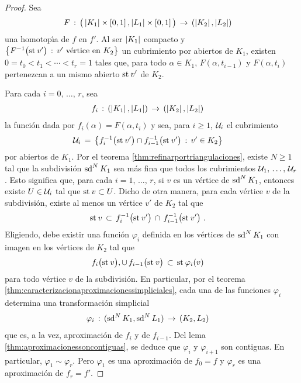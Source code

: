\begin{proof}
	Sea
	\begin{align*}
		F & \,:\,\big(\geom{K_{1}}\times\intervalo,
				\geom{L_{1}}\times\intervalo\big)
			\,\rightarrow\, (\geom{K_{2}},\geom{L_{2}})
	\end{align*}
	una homotop\'{\i}a de $f$ en $f'$. Al ser $\geom{K_{1}}$ compacto y
	\begin{math}
		\big\{F^{-1}\big(\estrella{v'}\big)\,:\,
			v'\text{ v\'{e}rtice en }K_{2}\big\}
	\end{math}
	un cubrimiento por abiertos de $K_{1}$, existen
	$0=t_{0}<t_{1}<\cdots<t_{r}=1$ tales que, para todo $\alpha\in K_{1}$,
	$F(\alpha,t_{i-1})$ y $F(\alpha,t_{i})$ pertenezcan a un mismo
	abierto $\estrella{v'}$ de $K_{2}$.

	Para cada $i=0,\,\dots,\,r$, sea
	\begin{align*}
		f_{i} & \,:\,(\geom{K_{1}},\geom{L_{1}})\,\rightarrow\,
			(\geom{K_{2}},\geom{L_{2}})
	\end{align*}
	la funci\'{o}n dada por $f_{i}(\alpha)=F(\alpha,t_{i})$ y sea,
	para $i\geq 1$, $\cal{U}_{i}$ el cubrimiento
	\begin{align*}
		\cal{U}_{i} & \,=\,\big\{
			f_{i}^{-1}\big(\estrella{v'}\big)\cap
				f_{i-1}^{-1}\big(\estrella{v'}\big)\,:\,
			v'\in K_{2}\big\}
	\end{align*}
	por abiertos de $K_{1}$. Por el teorema
	\ref{thm:refinarportriangulaciones}, existe $N\geq 1$ tal que la
	subdivisi\'{o}n $\subdiv[N]{K_{1}}$ sea m\'{a}s fina que todos los
	cubrimientos $\lista{\cal{U}}{r}$. Esto significa que, para cada
	$i=1,\,\dots,\,r$, si $v$ es un v\'{e}rtice de $\subdiv[N]{K_{1}}$,
	entonces existe $U\in\cal{U}_{i}$ tal que $\estrella v\subset U$.
	Dicho de otra manera, para cada v\'{e}rtice $v$ de la subdivisi\'{o}n,
	existe al menos un v\'{e}rtice $v'$ de $K_{2}$ tal que
	\begin{align*}
		\estrella v & \,\subset\,
			f_{i}^{-1}\big(\estrella{v'}\big)\,\cap\,
			f_{i-1}^{-1}\big(\estrella{v'}\big)
		\text{ .}
	\end{align*}
	Eligiendo, debe existir una funci\'{o}n $\varphi_{i}$ definida en
	los v\'{e}rtices de $\subdiv[N]{K_{1}}$ con imagen en los
	v\'{e}rtices de $K_{2}$ tal que
	\begin{align*}
		f_{i}\big(\estrella v\big),\cup\,
			f_{i-1}\big(\estrella v\big) & \,\subset\,
			\estrella{\varphi_{i}(v)}
	\end{align*}
	para todo v\'{e}rtice $v$ de la subdivisi\'{o}n. En particular, por
	el teorema \ref{thm:caracterizacionaproximacionessimpliciales},
	cada una de las funciones $\varphi_{i}$ determina una
	transformaci\'{o}n simplicial
	\begin{align*}
		\varphi_{i} & \,:\,(\subdiv[N]{K_{1}},\subdiv[N]{L_{1}})
			\,\rightarrow\,(K_{2},L_{2})
	\end{align*}
	que es, a la vez, aproximaci\'{o}n de
	$f_{i}$ y de $f_{i-1}$. Del lema \ref{thm:aproximacionessoncontiguas},
	se deduce que $\varphi_{i}$ y $\varphi_{i+1}$ son contiguas.
	En particular, $\varphi_{1}\sim\varphi_{r}$. Pero $\varphi_{1}$ es
	una aproximaci\'{o}n de $f_{0}=f$ y $\varphi_{r}$ es una
	aproximaci\'{o}n de $f_{r}=f'$.
\end{proof}

